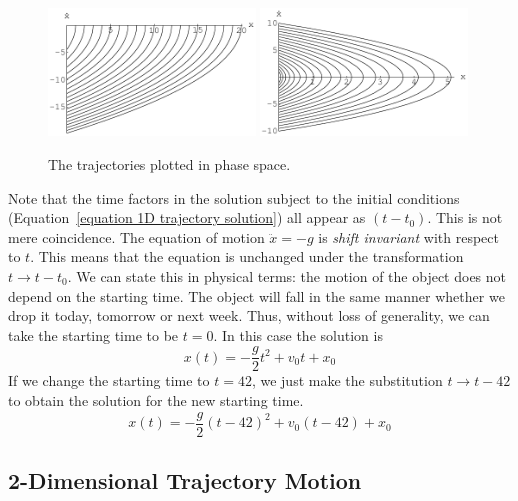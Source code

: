 \begin{figure}[tb!]
  \begin{center}
    \includegraphics[width=0.49\textwidth]{ode/introduction/trajectory_1d_xxd_x0}
    \includegraphics[width=0.49\textwidth]{ode/introduction/trajectory_1d_xxd_v0}
  \end{center}
  \caption{The trajectories plotted in phase space.}
  \label{figure trajectory 1d xxd}
\end{figure}


Note that the time factors in the solution subject to the initial conditions 
(Equation~\ref{equation 1D trajectory solution})
all appear as $(t - t_0)$.  This is not mere coincidence.  The equation
of motion $\ddot{x} = - g$ is \textit{shift invariant} with respect to $t$.
This means that the equation is unchanged under the transformation 
$t \to t - t_0$.   We can state this in physical terms: the motion of the 
object does not depend on the starting time.  The object will fall in 
the same manner whether we drop it today, tomorrow or next week.  Thus, 
without loss of generality, we can take the starting time to be $t = 0$.
In this case the solution is
\[
x(t) = - \frac{g}{2} t^2 + v_0 t + x_0
\]
If we change the starting time to $t = 42$, we just make the 
substitution $t \to t - 42$ to obtain the solution for the new 
starting time.
\[
x(t) = - \frac{g}{2} (t - 42)^2 + v_0 (t - 42) + x_0
\]



\subsection{2-Dimensional Trajectory Motion}

